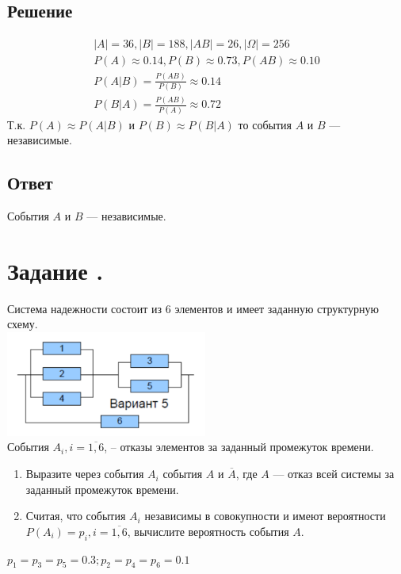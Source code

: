 \documentclass[12pt]{article}
\begin{document}
\subsection*{Решение}
\begin{gather*}
	|A| = 36, |B| = 188, |AB| = 26, |\Omega| = 256 \\
	P(A) \approx 0.14, P(B) \approx 0.73, P(AB) \approx 0.10 \\
	P(A|B) = \frac{P(AB)}{P(B)} \approx 0.14 \\
	P(B|A) = \frac{P(AB)}{P(A)} \approx 0.72
\end{gather*}
Т.к. $P(A) \approx P(A|B)$ и $P(B) \approx P(B|A)$ то события $A$ и $B$ --- независимые.
\subsection*{Ответ}
События $A$ и $B$ --- независимые.

\newpage
\section*{Задание .}
Система надежности состоит из 6 элементов и имеет заданную структурную схему. \\
\includegraphics{1.png} \\
События $A_i, i=\overline{1, 6}$, -- отказы элементов за заданный промежуток времени.
\begin{enumerate}
	\item Выразите через события $A_i$ события $A$ и $\overline{A}$, где $A$ — отказ всей системы за заданный промежуток времени.
	\item Считая, что события $A_i$ независимы в совокупности и имеют вероятности $P(A_i)=p_i, i = \overline{1,6}$, вычислите вероятность события $A$.
\end{enumerate}
$p_1 = p_3 = p_5 = 0.3; p_2 = p_4 = p_6 = 0.1$
\end{document}
